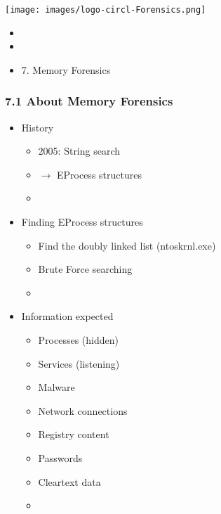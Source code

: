 %
%



\begin{frame}
    \texttt{[image: images/logo-circl-Forensics.png]}
    \begin{itemize}
        \item[]
        \item[]
        \item[] 7. Memory Forensics
    \end{itemize}
\end{frame}


\begin{frame}
  \frametitle{7.1 About Memory Forensics}
    \begin{itemize}
        \item History
            \begin{itemize}
                \item 2005: String search
		\item $\to$ EProcess structures
		\item[]
            \end{itemize}
        \item Finding EProcess structures
            \begin{itemize}
		\item Find the doubly linked list (ntoskrnl.exe)
		\item Brute Force searching
		\item[]
            \end{itemize}
        \item Information expected
            \begin{itemize}
		\item Processes (hidden)
		\item Services (listening)
                \item Malware
                \item Network connections
                \item Registry content
                \item Passwords
                \item Cleartext data
		\item[]
            \end{itemize}
    \end{itemize}
\end{frame}


